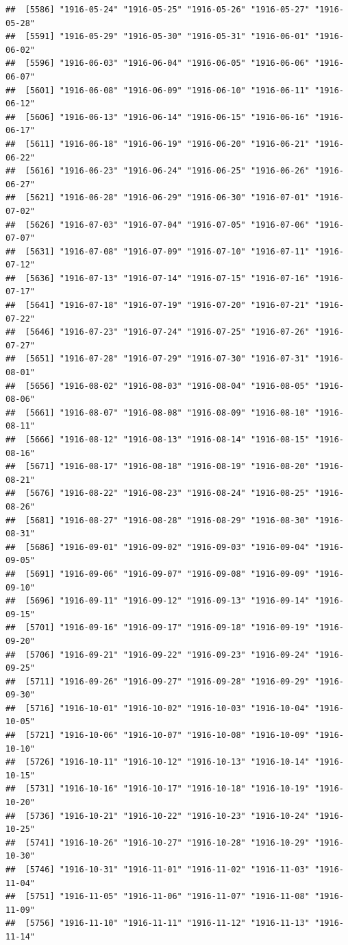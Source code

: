 \documentclass{article}\usepackage[]{graphicx}\usepackage[]{color}
\makeatletter
\newenvironment{kframe}{%
 \def\at@end@of@kframe{}%
 \ifinner\ifhmode%
  \def\at@end@of@kframe{\end{minipage}}%
  \begin{minipage}{\columnwidth}%
 \fi\fi%
 \def\FrameCommand##1{\hskip\@totalleftmargin \hskip-\fboxsep
 \colorbox{shadecolor}{##1}\hskip-\fboxsep
     \hskip-\linewidth \hskip-\@totalleftmargin \hskip\columnwidth}%
 \MakeFramed {\advance\hsize-\width
   \@totalleftmargin\z@ \linewidth\hsize
   \@setminipage}}%
 {\par\unskip\endMakeFramed%
 \at@end@of@kframe}
\newenvironment{knitrout}{}{} %
\makeatother
\begin{document}
\begin{description}
\begin{knitrout}
\begin{kframe}
\begin{verbatim}
##  [5586] "1916-05-24" "1916-05-25" "1916-05-26" "1916-05-27" "1916-05-28"
##  [5591] "1916-05-29" "1916-05-30" "1916-05-31" "1916-06-01" "1916-06-02"
##  [5596] "1916-06-03" "1916-06-04" "1916-06-05" "1916-06-06" "1916-06-07"
##  [5601] "1916-06-08" "1916-06-09" "1916-06-10" "1916-06-11" "1916-06-12"
##  [5606] "1916-06-13" "1916-06-14" "1916-06-15" "1916-06-16" "1916-06-17"
##  [5611] "1916-06-18" "1916-06-19" "1916-06-20" "1916-06-21" "1916-06-22"
##  [5616] "1916-06-23" "1916-06-24" "1916-06-25" "1916-06-26" "1916-06-27"
##  [5621] "1916-06-28" "1916-06-29" "1916-06-30" "1916-07-01" "1916-07-02"
##  [5626] "1916-07-03" "1916-07-04" "1916-07-05" "1916-07-06" "1916-07-07"
##  [5631] "1916-07-08" "1916-07-09" "1916-07-10" "1916-07-11" "1916-07-12"
##  [5636] "1916-07-13" "1916-07-14" "1916-07-15" "1916-07-16" "1916-07-17"
##  [5641] "1916-07-18" "1916-07-19" "1916-07-20" "1916-07-21" "1916-07-22"
##  [5646] "1916-07-23" "1916-07-24" "1916-07-25" "1916-07-26" "1916-07-27"
##  [5651] "1916-07-28" "1916-07-29" "1916-07-30" "1916-07-31" "1916-08-01"
##  [5656] "1916-08-02" "1916-08-03" "1916-08-04" "1916-08-05" "1916-08-06"
##  [5661] "1916-08-07" "1916-08-08" "1916-08-09" "1916-08-10" "1916-08-11"
##  [5666] "1916-08-12" "1916-08-13" "1916-08-14" "1916-08-15" "1916-08-16"
##  [5671] "1916-08-17" "1916-08-18" "1916-08-19" "1916-08-20" "1916-08-21"
##  [5676] "1916-08-22" "1916-08-23" "1916-08-24" "1916-08-25" "1916-08-26"
##  [5681] "1916-08-27" "1916-08-28" "1916-08-29" "1916-08-30" "1916-08-31"
##  [5686] "1916-09-01" "1916-09-02" "1916-09-03" "1916-09-04" "1916-09-05"
##  [5691] "1916-09-06" "1916-09-07" "1916-09-08" "1916-09-09" "1916-09-10"
##  [5696] "1916-09-11" "1916-09-12" "1916-09-13" "1916-09-14" "1916-09-15"
##  [5701] "1916-09-16" "1916-09-17" "1916-09-18" "1916-09-19" "1916-09-20"
##  [5706] "1916-09-21" "1916-09-22" "1916-09-23" "1916-09-24" "1916-09-25"
##  [5711] "1916-09-26" "1916-09-27" "1916-09-28" "1916-09-29" "1916-09-30"
##  [5716] "1916-10-01" "1916-10-02" "1916-10-03" "1916-10-04" "1916-10-05"
##  [5721] "1916-10-06" "1916-10-07" "1916-10-08" "1916-10-09" "1916-10-10"
##  [5726] "1916-10-11" "1916-10-12" "1916-10-13" "1916-10-14" "1916-10-15"
##  [5731] "1916-10-16" "1916-10-17" "1916-10-18" "1916-10-19" "1916-10-20"
##  [5736] "1916-10-21" "1916-10-22" "1916-10-23" "1916-10-24" "1916-10-25"
##  [5741] "1916-10-26" "1916-10-27" "1916-10-28" "1916-10-29" "1916-10-30"
##  [5746] "1916-10-31" "1916-11-01" "1916-11-02" "1916-11-03" "1916-11-04"
##  [5751] "1916-11-05" "1916-11-06" "1916-11-07" "1916-11-08" "1916-11-09"
##  [5756] "1916-11-10" "1916-11-11" "1916-11-12" "1916-11-13" "1916-11-14"

\end{verbatim}
\end{kframe}
\end{knitrout}
\end{description}
\end{document}
